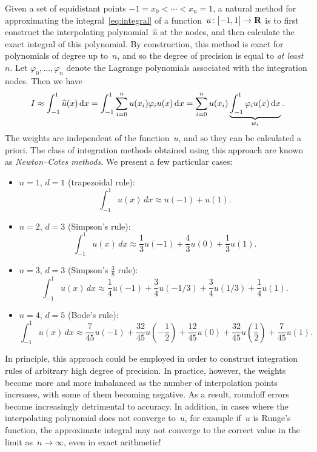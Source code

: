 Given a set of equidistant points $-1 = x_0 < \dotsb < x_n = 1$,
a natural method for approximating the integral~\eqref{eq:integral} of a function~$u\colon [-1, 1] \to \mathbf R$
is to first construct the interpolating polynomial~$\widehat u$ at the nodes,
and then calculate the exact integral of this polynomial.
By construction, this method is exact for polynomials of degree up to~$n$,
and so the degree of precision is equal to \emph{at least}~$n$.
Let $\varphi_0, \dotsc, \varphi_n$ denote the Lagrange polynomials associated with the integration nodes.
Then we have
\[
    I \approx \int_{-1}^{1} \widehat u(x) \, \mathrm d x
    = \int_{-1}^{1} \sum_{i=0}^{n} u(x_i) \varphi_i u(x) \, \mathrm d x
    = \sum_{i=0}^{n} u(x_i) \underbrace{\int_{-1}^{1}  \varphi_i u(x)  \, \mathrm d x}_{w_i}.
\]
The weights are independent of the function~$u$,
and so they can be calculated a priori.
The class of integration methods obtained using this approach are known as \emph{Newton--Cotes methods}.
We present a few particular cases:
\begin{itemize}
    \item
        $n = 1$, $d = 1$ (trapezoidal rule):
        \begin{equation}
            \label{eq:trapezoidal_rule}
            \int_{-1}^{1} u(x) \, dx
            \approx u(-1) + u(1).
        \end{equation}

    \item
        $n = 2$, $d = 3$ (Simpson's rule):
        \begin{equation}
            \label{eq:simpsons}
            \int_{-1}^{1} u(x) \, dx
            \approx \frac{1}{3} u(-1) + \frac{4}{3} u(0) + \frac{1}{3} u(1).
        \end{equation}

    \item
        $n = 3$, $d = 3$ (Simpson's $\frac{3}{8}$ rule):
        \[
            \int_{-1}^{1} u(x) \, dx
            \approx \frac{1}{4} u(-1) + \frac{3}{4} u(-1/3) + \frac{3}{4} u(1/3) + \frac{1}{4} u(1).
        \]

    \item
        $n = 4$, $d = 5$ (Bode's rule):
        \[
            \int_{-1}^{1} u(x) \, dx
            \approx \frac{7}{45} u(-1) + \frac{32}{45} u\left(-\frac{1}{2}\right) + \frac{12}{45} u\left(0\right) + \frac{32}{45} u\left(\frac{1}{2}\right) + \frac{7}{45} u(1).
        \]
\end{itemize}
In principle,
this approach could be employed in order to construct integration rules of arbitrary high degree of precision.
In practice, however, the weights become more and more imbalanced as the number of interpolation points increases,
with some of them becoming negative.
As a result, roundoff errors become increasingly detrimental to accuracy.
In addition, in cases where the interpolating polynomial does not converge to~$u$,
for example if~$u$ is Runge's function,
the approximate integral may not converge to the correct value in the limit as~$n \to \infty$,
even in exact arithmetic!

